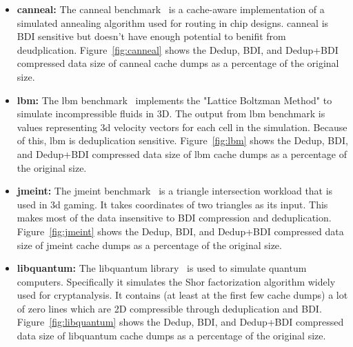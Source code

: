 \begin{itemize}
    \item \textbf{canneal:} The canneal benchmark~\cite{parsec} is a cache-aware implementation of a simulated annealing algorithm used for routing in chip designs. canneal is BDI sensitive but doesn't have enough potential to benifit from deudplication. Figure~\ref{fig:canneal} shows the Dedup, BDI, and Dedup+BDI compressed data size of canneal cache dumps as a percentage of the original size.
    \item \textbf{lbm:} The lbm benchmark~\cite{spec} implements the "Lattice Boltzman Method" to simulate incompressible fluids in 3D. The output from lbm benchmark is values representing 3d velocity vectors for each cell in the simulation. Because of this, lbm is deduplication sensitive. Figure~\ref{fig:lbm} shows the Dedup, BDI, and Dedup+BDI compressed data size of lbm cache dumps as a percentage of the original size.
    \item \textbf{jmeint:} The jmeint benchmark~\cite{axbench} is a triangle intersection workload that is used in 3d gaming. It takes coordinates of two triangles as its input. This makes most of the data insensitive to BDI compression and deduplication. Figure~\ref{fig:jmeint} shows the Dedup, BDI, and Dedup+BDI compressed data size of jmeint cache dumps as a percentage of the original size.
    \item \textbf{libquantum:} The libquantum library~\cite{spec} is used to simulate quantum computers. Specifically it simulates the Shor factorization algorithm widely used for cryptanalysis. It contains (at least at the first few cache dumps) a lot of zero lines which are 2D compressible through deduplication and BDI. Figure~\ref{fig:libquantum} shows the Dedup, BDI, and Dedup+BDI compressed data size of libquantum cache dumps as a percentage of the original size.
\end{itemize}
